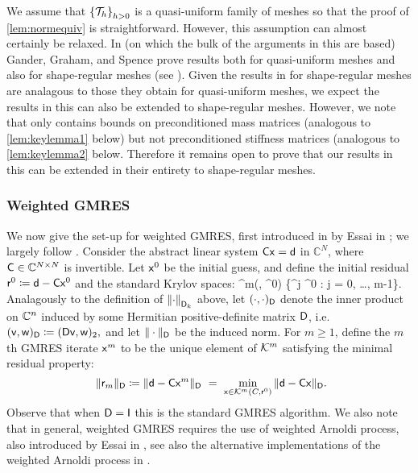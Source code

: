 \label{rem:ggsqu}
We assume that $\set{\Th}_{h>0}$ is a quasi-uniform family of meshes so that the proof of \cref{lem:normequiv} is straightforward. However, this assumption can almost certainly be relaxed. In \cite{GaGrSp:15} (on which the bulk of the arguments in this  are based) Gander, Graham, and Spence prove results both for quasi-uniform meshes and also for shape-regular meshes (see \cite[Sections 3.4 and 4.1.2]{GaGrSp:15}). Given the results in \cite{GaGrSp:15} for shape-regular meshes are analagous to those they obtain for quasi-uniform meshes, we expect the results in this  can also be extended to shape-regular meshes. However, we note that \cite{GaGrSp:15} only contains bounds on preconditioned mass matrices (analogous to \cref{lem:keylemma1} below) but not preconditioned stiffness matrices (analogous to \cref{lem:keylemma2} below. Therefore it remains open to prove that our results in this  can be extended in their entirety to shape-regular meshes.
\ere



\subsubsection{Weighted GMRES}

We now give the set-up for weighted GMRES, first introduced in by Essai in \cite{Es:98}; we largely follow \cite[Section 5]{GrSpVa:17}. Consider the abstract  linear system 
$\mathsf{C} \mathsf{x} = \mathsf{d}$
in $\mathbb{C}^N$, where $\mathsf{C} \in \mathbb C^{N\times N}$ is invertible. Let $\mathsf{x}^{0}$ be the initial guess, and define the initial residual $\mathsf{r}^0 \coloneqq \mathsf{d}- \mathsf{C} \mathsf{x}^0$ and the standard Krylov spaces:  
\beqs  
\cK^m(\Cmat, \rvec^0) \de {}\big\{\matrixC^j \rvec^0 : j = 0, \ldots, m-1\big\}.
\eeqs
Analagously to the definition of $\NDk{\cdot}$ above, let $(\cdot , \cdot )_{\mathsf{D}}$ denote the inner product on $\mathbb C^n$ 
induced by some Hermitian positive-definite matrix $\mathsf{D}$, i.e.~
$(\mathsf{v},\mathsf{w})_{\mathsf{D}} \coloneqq (\mathsf{D} \mathsf{v}, \mathsf{w})_2,$
and let $\Vert \cdot \Vert_{\mathsf{D}}$ be the induced norm. For $m \geq 1$, define the $m$th GMRES iterate $\mathsf{x}^m$  to be  the unique element of $\mathcal K^m$ satisfying  the  
 minimal residual  property: 
$$ \ \Vert \rvecm \Vert_\Dmat \de \Vert \dvec - \matrixC \xvec^m \Vert_\Dmat \ = \ \min_{\xvec \in \cK^m(C, \rvec^0)} \Vert {\dvec} - {\matrixC} {\xvec} \Vert_\Dmat. $$
Observe that when $\mathsf{D} = \mathsf{I}$ this is the standard GMRES algorithm. We also note that in general, weighted GMRES requires the use of weighted Arnoldi process, also introduced by Essai in \cite{Es:98}, see also the alternative implementations of the weighted Arnoldi process in \cite{GuPe:14}.




